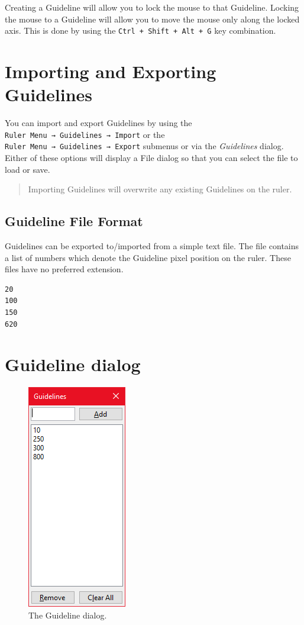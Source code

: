\documentclass[
]{book}
\begin{document}
Creating a Guideline will allow you to lock the mouse to that Guideline.
Locking the mouse to a Guideline will allow you to move the mouse only along the locked axis.
This is done by using the \texttt{Ctrl\ +\ Shift\ +\ Alt\ +\ G} key combination.

\section{Importing and Exporting Guidelines}\label{importing-and-exporting-guidelines}

You can import and export Guidelines by using the \texttt{Ruler\ Menu\ →\ Guidelines\ →\ Import} or the \texttt{Ruler\ Menu\ →\ Guidelines\ →\ Export} submenus or via the \emph{Guidelines} dialog.
Either of these options will display a File dialog so that you can select the file to load or save.

\begin{quote}
Importing Guidelines will overwrite any existing Guidelines on the ruler.
\end{quote}

\subsection{Guideline File Format}\label{guideline-file-format}

Guidelines can be exported to/imported from a simple text file.
The file contains a list of numbers which denote the Guideline pixel position on the ruler.
These files have no preferred extension.

\begin{verbatim}
20
100
150
620
\end{verbatim}

\section{Guideline dialog}\label{guideline-dialog}

\begin{figure}
\centering
\includegraphics{images/guideline-dialog.png}
\caption{\label{fig:unnamed-chunk-3}The Guideline dialog.}
\end{figure}
\end{document}
